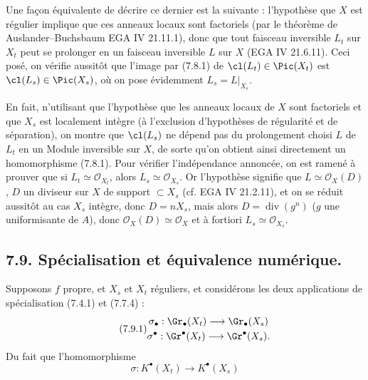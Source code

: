 Une façon
équivalente de décrire ce dernier est la suivante : l'hypothèse que \(X\) est régulier implique que ces anneaux locaux sont factoriels (par le théorème de Auslander--Buchsbaum EGA IV 21.11.1), donc que tout faisceau inversible \(L_t\) sur \(X_t\) peut se prolonger en un faisceau inversible \(L\) sur \(X\) (EGA IV 21.6.11). Ceci posé, on vérifie aussitôt que l'image par (7.8.1) de \(\cl(L_t)\in\Pic(X_t)\) est \(\cl(L_s)\in\Pic(X_s)\), où on pose évidemment \(L_s=L|_{X_s}\).

En fait, n'utilisant que l'hypothèse que les anneaux locaux de \(X\) sont factoriels et que \(X_s\) est localement intègre (à l'exclusion d'hypothèses de régularité et de séparation), on montre que \(\cl(L_s)\) ne dépend pas du prolongement choisi \(L\) de \(L_t\) en un Module inversible sur \(X\), de sorte qu'on obtient ainsi directement un homomorphisme (7.8.1). Pour vérifier l'indépendance annoncée, on est ramené à prouver que si \(L_t\simeq\mathcal O_{X_t}\), alors \(L_s\simeq\mathcal O_{X_s}\). Or l'hypothèse signifie que \(L\simeq\mathcal O_X(D)\), \(D\) un diviseur sur \(X\) de support \(\subset X_s\) (cf. EGA IV 21.2.11), et on se réduit aussitôt au cas \(X_s\) intègre, donc \(D=nX_s\), mais alors \(D=\operatorname{div}(g^n)\) (\(g\) une uniformisante de \(A\)), donc \(\mathcal O_X(D)\simeq\mathcal O_X\) et à fortiori \(L_s\simeq\mathcal O_{X_s}\).

\subsection*{7.9. Spécialisation et équivalence numérique.}
Supposons \(f\) propre, et \(X_s\) et \(X_t\) réguliers, et considérons les deux applications de spécialisation (7.4.1) et (7.7.4) :
\begin{equation}\tag{7.9.1}
\begin{gathered}
  \sigma_\bullet:\Gr_\bullet(X_t)\longrightarrow\Gr_\bullet(X_s)\\
  \sigma^\bullet:\Gr^\bullet(X_t)\longrightarrow\Gr^\bullet(X_s).
\end{gathered}
\end{equation}
Du fait que l'homomorphisme
\begin{equation}\tag{7.9.2}
  \sigma:K^\bullet(X_t)\longrightarrow K^\bullet(X_s)
\end{equation}
